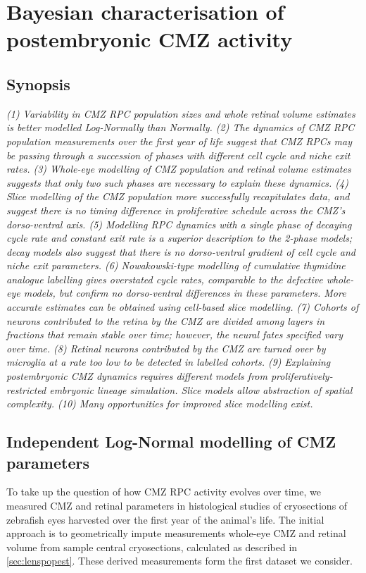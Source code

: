 \chapter{Bayesian characterisation of postembryonic CMZ activity}
\label{chap:CMZ}
\section*{Synopsis}
\textit{(1) Variability in CMZ RPC population sizes and whole retinal volume estimates is better modelled Log-Normally than Normally. (2) The dynamics of CMZ RPC population measurements over the first year of life suggest that CMZ RPCs may be passing through a succession of phases with different cell cycle and niche exit rates. (3) Whole-eye modelling of CMZ population and retinal volume estimates suggests that only two such phases are necessary to explain these dynamics. (4) Slice modelling of the CMZ population more successfully recapitulates data, and suggest there is no timing difference in proliferative schedule across the CMZ's dorso-ventral axis. (5) Modelling RPC dynamics with a single phase of decaying cycle rate and constant exit rate is a superior description to the 2-phase models; decay models also suggest that there is no dorso-ventral gradient of cell cycle and niche exit parameters. (6) Nowakowski-type modelling of cumulative thymidine analogue labelling gives overstated cycle rates, comparable to the defective whole-eye models, but confirm no dorso-ventral differences in these parameters. More accurate estimates can be obtained using cell-based slice modelling. (7) Cohorts of neurons contributed to the retina by the CMZ are divided among layers in fractions that remain stable over time; however, the neural fates specified vary over time. (8) Retinal neurons contributed by the CMZ are turned over by microglia at a rate too low to be detected in labelled cohorts. (9) Explaining postembryonic CMZ dynamics requires different models from proliferatively-restricted embryonic lineage simulation. Slice models allow abstraction of spatial complexity. (10) Many opportunities for improved slice modelling exist.}

\section{Independent Log-Normal modelling of CMZ parameters}
To take up the question of how CMZ RPC activity evolves over time, we measured CMZ and retinal parameters in histological studies of cryosections of zebrafish eyes harvested over the first year of the animal's life. The initial approach is to geometrically impute measurements whole-eye CMZ and retinal volume from sample central cryosections, calculated as described in \autoref{sec:lenspopest}. These derived measurements form the first dataset we consider.

